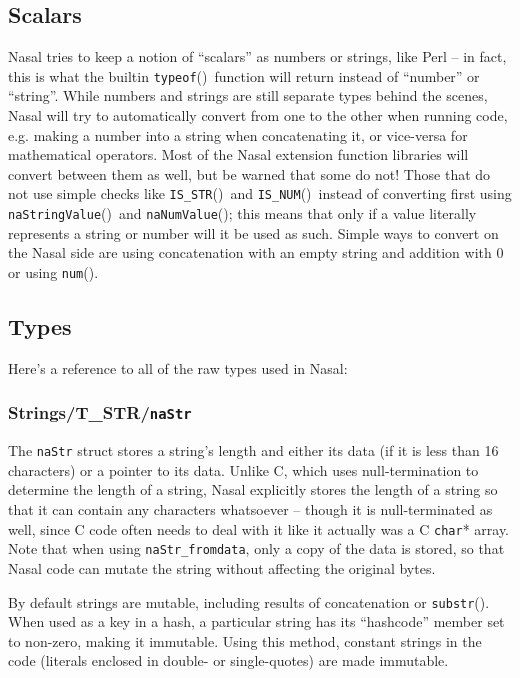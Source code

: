 \documentclass{article}
\newcommand{\type}[1]{\textcolor{type}{\tt #1}}
\newcommand{\func}[1]{\textcolor{func}{\tt #1}}
\newcommand{\globalmacro}[1]{\textcolor{func}{\tt #1}}
\newcommand{\nasalapi}[1]{\func{#1}}
\newcommand{\fp}{\textcolor{func}{()}}
\begin{document}
\subsection{Scalars}
Nasal tries to keep a notion of ``scalars'' as numbers or strings, like Perl -- in fact, this is what the builtin \func{typeof}\fp\ function will return instead of ``number'' or ``string''.  While numbers and strings are still separate types behind the scenes, Nasal will try to automatically convert from one to the other when running code, e.g. making a number into a string when concatenating it, or vice-versa for mathematical operators.  Most of the Nasal extension function libraries will convert between them as well, but be warned that some do not!  Those that do not use simple checks like \globalmacro{IS\_STR}\fp\ and \globalmacro{IS\_NUM}\fp\ instead of converting first using \func{naStringValue}\fp\ and \func{naNumValue}\fp; this means that only if a value literally represents a string or number will it be used as such.  Simple ways to convert on the Nasal side are using concatenation with an empty string and addition with 0 or using \func{num}\fp.

\subsection{Types}
Here's a reference to all of the raw types used in Nasal:

\subsubsection{Strings/T\_STR/\type{naStr}}
The \type{naStr} struct stores a string's length and either its data (if it is less than 16 characters) or a pointer to its data.  Unlike C, which uses null-termination to determine the length of a string, Nasal explicitly stores the length of a string so that it can contain any characters whatsoever -- though it is null-terminated as well, since C code often needs to deal with it like it actually was a C \type{char}* array.  Note that when using \nasalapi{naStr\_fromdata}, only a copy of the data is stored, so that Nasal code can mutate the string without affecting the original bytes.

By default strings are mutable, including results of concatenation or \func{substr}\fp.  When used as a key in a hash, a particular string has its ``hashcode'' member set to non-zero, making it immutable.  Using this method, constant strings in the code (literals enclosed in double- or single-quotes) are made immutable.
\end{document}
